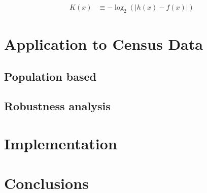 \documentclass{article} %
\begin{document}
\begin{align}
K(x) &\equiv -\log_2 \left( | h(x) - f(x) | \right)
\end{align}

\section{Application to Census Data}

\subsection{Population based}

\subsection{Robustness analysis}


\section{Implementation}


\section{Conclusions}
\end{document}
